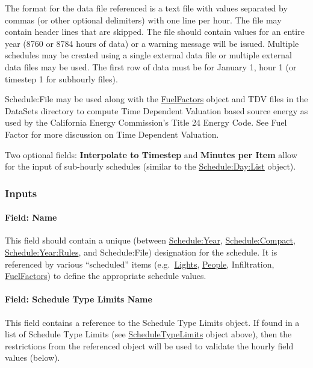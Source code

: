 The format for the data file referenced is a text file with values separated by commas (or other optional delimiters) with one line per hour. The file may contain header lines that are skipped. The file should contain values for an entire year (8760 or 8784 hours of data) or a warning message will be issued. Multiple schedules may be created using a single external data file or multiple external data files may be used. The first row of data must be for January 1, hour 1 (or timestep 1 for subhourly files).

Schedule:File may be used along with the \hyperref[fuelfactors]{FuelFactors} object and TDV files in the DataSets directory to compute Time Dependent Valuation based source energy as used by the California Energy Commission's Title 24 Energy Code. See Fuel Factor for more discussion on Time Dependent Valuation.

Two optional fields: \textbf{Interpolate to Timestep} and \textbf{Minutes per Item} allow for the input of sub-hourly schedules (similar to the \hyperref[scheduledaylist]{Schedule:Day:List} object).

\subsubsection{Inputs}\label{inputs-9-019}

\paragraph{Field: Name}\label{field-name-8-018}

This field should contain a unique (between \hyperref[scheduleyear]{Schedule:Year}, \hyperref[schedulecompact]{Schedule:Compact}, \hyperref[scheduleyearrules]{Schedule:Year:Rules}, and Schedule:File) designation for the schedule. It is referenced by various ``scheduled'' items (e.g.~\hyperref[lights-000]{Lights}, \hyperref[people]{People}, Infiltration, \hyperref[fuelfactors]{FuelFactors}) to define the appropriate schedule values.

\paragraph{Field: Schedule Type Limits Name}\label{field-schedule-type-limits-name-6}

This field contains a reference to the Schedule Type Limits object. If found in a list of Schedule Type Limits (see \hyperref[scheduletypelimits]{ScheduleTypeLimits} object above), then the restrictions from the referenced object will be used to validate the hourly field values (below).

